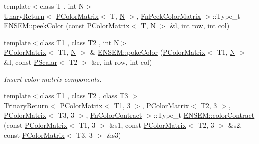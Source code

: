 \begin{DoxyCompactItemize}
\item 
{\footnotesize template$<$class T , int N$>$ }\\\mbox{\hyperlink{structENSEM_1_1UnaryReturn}{Unary\+Return}}$<$ \mbox{\hyperlink{classENSEM_1_1PColorMatrix}{P\+Color\+Matrix}}$<$ T, \mbox{\hyperlink{adat__devel_2lib_2hadron_2operator__name__util_8cc_a7722c8ecbb62d99aee7ce68b1752f337}{N}} $>$, \mbox{\hyperlink{structENSEM_1_1FnPeekColorMatrix}{Fn\+Peek\+Color\+Matrix}} $>$\+::Type\+\_\+t \mbox{\hyperlink{group__primcolormatrix_ga44a6b0393ecffb0c4aecc93b45a8d12d}{E\+N\+S\+E\+M\+::peek\+Color}} (const \mbox{\hyperlink{classENSEM_1_1PColorMatrix}{P\+Color\+Matrix}}$<$ T, \mbox{\hyperlink{adat__devel_2lib_2hadron_2operator__name__util_8cc_a7722c8ecbb62d99aee7ce68b1752f337}{N}} $>$ \&l, int row, int col)
\item 
{\footnotesize template$<$class T1 , class T2 , int N$>$ }\\\mbox{\hyperlink{classENSEM_1_1PColorMatrix}{P\+Color\+Matrix}}$<$ T1, \mbox{\hyperlink{adat__devel_2lib_2hadron_2operator__name__util_8cc_a7722c8ecbb62d99aee7ce68b1752f337}{N}} $>$ \& \mbox{\hyperlink{group__primcolormatrix_ga83e068e757a42e9866992b38a003d7f9}{E\+N\+S\+E\+M\+::poke\+Color}} (\mbox{\hyperlink{classENSEM_1_1PColorMatrix}{P\+Color\+Matrix}}$<$ T1, \mbox{\hyperlink{adat__devel_2lib_2hadron_2operator__name__util_8cc_a7722c8ecbb62d99aee7ce68b1752f337}{N}} $>$ \&l, const \mbox{\hyperlink{classENSEM_1_1PScalar}{P\+Scalar}}$<$ T2 $>$ \&r, int row, int col)
\begin{DoxyCompactList}\small\item\em Insert color matrix components. \end{DoxyCompactList}\item 
{\footnotesize template$<$class T1 , class T2 , class T3 $>$ }\\\mbox{\hyperlink{structENSEM_1_1TrinaryReturn}{Trinary\+Return}}$<$ \mbox{\hyperlink{classENSEM_1_1PColorMatrix}{P\+Color\+Matrix}}$<$ T1, 3 $>$, \mbox{\hyperlink{classENSEM_1_1PColorMatrix}{P\+Color\+Matrix}}$<$ T2, 3 $>$, \mbox{\hyperlink{classENSEM_1_1PColorMatrix}{P\+Color\+Matrix}}$<$ T3, 3 $>$, \mbox{\hyperlink{structENSEM_1_1FnColorContract}{Fn\+Color\+Contract}} $>$\+::Type\+\_\+t \mbox{\hyperlink{group__primcolormatrix_ga200705dac956b2d421ea1793fdb916b9}{E\+N\+S\+E\+M\+::color\+Contract}} (const \mbox{\hyperlink{classENSEM_1_1PColorMatrix}{P\+Color\+Matrix}}$<$ T1, 3 $>$ \&s1, const \mbox{\hyperlink{classENSEM_1_1PColorMatrix}{P\+Color\+Matrix}}$<$ T2, 3 $>$ \&s2, const \mbox{\hyperlink{classENSEM_1_1PColorMatrix}{P\+Color\+Matrix}}$<$ T3, 3 $>$ \&s3)

\end{DoxyCompactItemize}
